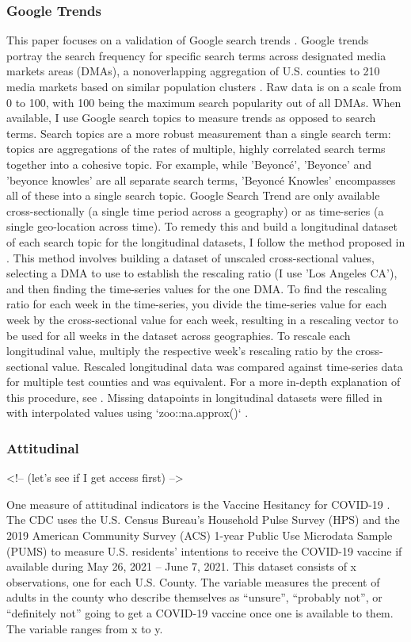 \subsubsection{Google Trends}
This paper focuses on a validation of Google search trends \citep{googletrends}.
Google trends portray the search frequency for specific search terms across
designated media markets areas (DMAs), a nonoverlapping aggregation of U.S.
counties to 210 media markets based on similar population clusters \citep{dma_key}.
Raw data is on a scale from 0 to 100, with 100 being the maximum search
popularity out of all DMAs. When available, I use Google search topics to
measure trends as opposed to search terms. Search topics are a more robust
measurement than a single search term: topics are aggregations of the rates of
multiple, highly correlated search terms together into a cohesive topic. For
example, while 'Beyoncé', 'Beyonce' and 'beyonce knowles' are all separate
search terms, 'Beyoncé Knowles' encompasses all of these into a single search
topic. Google Search Trend are only available cross-sectionally (a single time
period across a geography) or as time-series (a single geo-location across
time). To remedy this and build a longitudinal dataset of each search topic for
the longitudinal datasets, I follow the method proposed in \citet[p. 5]{park_etal}.
This method involves building a dataset of unscaled cross-sectional values,
selecting a DMA to use to establish the rescaling ratio (I use 'Los Angeles
CA'), and then finding the time-series values for the one DMA. To find the
rescaling ratio for each week in the time-series, you divide the time-series
value for each week by the cross-sectional value for each week, resulting in a
rescaling vector to be used for all weeks in the dataset across geographies. To
rescale each longitudinal value, multiply the respective week's rescaling ratio
by the cross-sectional value. Rescaled longitudinal data was compared against
time-series data for multiple test counties and was equivalent. For a more
in-depth explanation of this procedure, see \citet[p. 5]{park_etal}. Missing
datapoints in longitudinal datasets were filled in with interpolated values
using `zoo::na.approx()` \citep{zoo}.

\subsubsection{Attitudinal}
<!-- \citep{gss_data} (let's see if I get access first) -->

One measure of attitudinal indicators is the Vaccine Hesitancy for COVID-19
\citep{vaches_data}. The CDC uses the U.S. Census Bureau’s Household Pulse Survey
(HPS) and the 2019 American Community Survey (ACS) 1-year Public Use Microdata
Sample (PUMS) to measure U.S. residents’ intentions to receive the COVID-19
vaccine if available during May 26, 2021 – June 7, 2021. This dataset consists
of x observations, one for each U.S. County. The variable
measures the precent of adults in the county who describe themselves as
“unsure”, “probably not”, or “definitely not” going to get a COVID-19 vaccine
once one is available to them. The variable ranges from x to y. 

